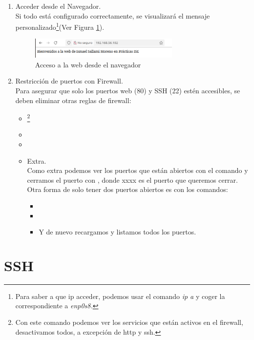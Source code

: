 \begin{enumerate}
  \item Acceder desde el Navegador.\\
  Si todo está configurado correctamente, se visualizará el mensaje personalizado\footnote{Para saber a que ip acceder, podemos usar el comando \textit{ip a} y coger la correspondiente a \textit{enp0s8.}}(Ver Figura \ref{web}).
  \begin{figure}[H]
    \centering
      \includegraphics[width=0.7\textwidth]{images/Bloque1/web.png}
      \caption{Acceso a la web desde el navegador}
      \label{web}
  \end{figure}
  \item Restricción de puertos con Firewall.\\
  Para asegurar que solo los puertos web (80) y SSH (22) estén accesibles, se deben eliminar
otras reglas de firewall:
\begin{itemize}
  \item {}\footnote{Con este comando podemos ver los servicios que están activos en el firewall, desactivamos todos, a excepción de http y ssh.}
  \item {}
  \item {}
  \item Extra.\\
  Como extra podemos ver los puertos que están abiertos con el comando  y cerramos el puerto con , donde xxxx es el puerto que queremos cerrar. Otra forma de solo tener dos puertos abiertos es con los comandos:
  \begin{itemize}
    \item {}
    \item {}
    \item Y de nuevo recargamos y listamos todos los puertos.
  \end{itemize}
\end{itemize}
\end{enumerate}

\newpage
\section{SSH}

